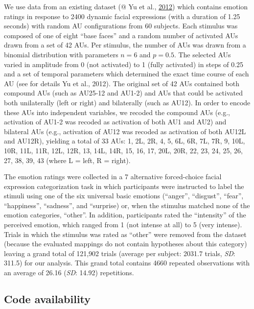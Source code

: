 \documentclass[11pt,american,a4paper,oneside,]{memoir} %
\begin{document}
We use data from an existing dataset (@ Yu et al., \protect\hyperlink{ref-Yu2012-ag}{2012}) which contains emotion ratings in response to 2400 dynamic facial expressions (with a duration of 1.25 seconds) with random AU configurations from 60 subjects. Each stimulus was composed of one of eight ``base faces'' and a random number of activated AUs drawn from a set of 42 AUs. Per stimulus, the number of AUs was drawn from a binomial distribution with parameters \(n = 6\) and \(p = 0.5\). The selected AUs varied in amplitude from 0 (not activated) to 1 (fully activated) in steps of 0.25 and a set of temporal parameters which determined the exact time course of each AU (see for details Yu et al., 2012). The original set of 42 AUs contained both compound AUs (such as AU25-12 and AU1-2) and AUs that could be activated both unilaterally (left or right) and bilaterally (such as AU12). In order to encode these AUs into independent variables, we recoded the compound AUs (e.g., activation of AU1-2 was recoded as activation of both AU1 and AU2) and bilateral AUs (e.g., activation of AU12 was recoded as activation of both AU12L and AU12R), yielding a total of 33 AUs: 1, 2L, 2R, 4, 5, 6L, 6R, 7L, 7R, 9, 10L, 10R, 11L, 11R, 12L, 12R, 13, 14L, 14R, 15, 16, 17, 20L, 20R, 22, 23, 24, 25, 26, 27, 38, 39, 43 (where L = left, R = right).

The emotion ratings were collected in a 7 alternative forced-choice facial expression categorization task in which participants were instructed to label the stimuli using one of the six universal basic emotions (``anger'', ``disgust'', ``fear'', ``happiness'', ``sadness'', and ``surprise) or, when the stimulus matched none of the emotion categories, ``other''. In addition, participants rated the ``intensity'' of the perceived emotion, which ranged from 1 (not intense at all) to 5 (very intense). Trials in which the stimulus was rated as ``other'' were removed from the dataset (because the evaluated mappings do not contain hypotheses about this category) leaving a grand total of 121,902 trials (average per subject: 2031.7 trials, \emph{SD}: 311.5) for our analysis. This grand total contains 4660 repeated observations with an average of 26.16 (\emph{SD}: 14.92) repetitions.

\hypertarget{hka-code}{%
\subsection{Code availability}\label{hka-code}}
\end{document}
